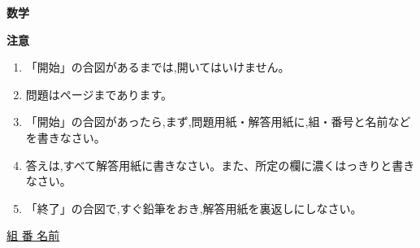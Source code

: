 \documentclass[
  12pt,a4paper,lualatex,ja=standard]{bxjsarticle}
\begin{document}
\makeatletter
\newenvironment{figurehere}{\def\@captype{figure}}{}
\makeatother

\newcommand{\haiten}[1]{%
\begin{flushright}%
\footnotesize{＜#1＞}%
\end{flushright}%
}


\thispagestyle{empty}
\begin{center}
\phantom{empty}

\vspace{60truemm}

\hspace{4em} {\HUGE\gtfamily\bfseries 数\hspace{2em}学}\\
\vspace{84truemm}

{\large\gtfamily\bfseries 注\hspace{5em}意}

\end{center}

\centering
\begin{framed}
\begin{flushleft}
\begin{enumerate}
  \item {\large 「開始」の合図があるまでは,開いてはいけません。}

  \item {\large 問題は\pageref{LastPage}ページまであります。}

  \item {\large 「開始」の合図があったら,まず,問題用紙・解答用紙に,組・番号と名前などを書きなさい。}

  \item {\large 答えは,すべて解答用紙に書きなさい。また、所定の欄に濃くはっきりと書きなさい。}

  \item {\large 「終了」の合図で,すぐ鉛筆をおき,解答用紙を裏返しにしなさい。}
\end{enumerate}
\end{flushleft}
\end{framed}

\vspace{14mm}

\begin{center}
{\large \underline{\hspace{30mm}組 \hspace{30mm}番 \hspace{15mm} 名前 \hspace{60mm}}}
\end{center}
\end{document}
